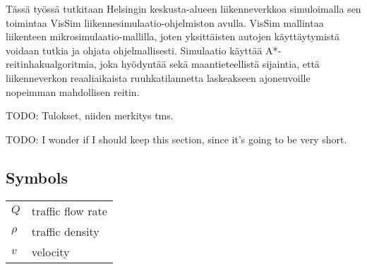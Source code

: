 \documentclass[english, 12pt, a4paper, elec, utf8, pdfa, online]{aaltothesis}
\newcommand{\pubdate}{<Publish date>}
\begin{document}
\begin{abstractpage}[finnish]
{    Tässä työssä tutkitaan Helsingin keskusta-alueen liikenneverkkoa simuloimalla sen toimintaa VisSim liikennesimulaatio-ohjelmiston avulla. VisSim mallintaa liikenteen mikrosimulaatio-mallilla, joten yksittäisten autojen käyttäytymistä voidaan tutkia ja ohjata ohjelmallisesti. Simulaatio käyttää A*-reitinhakualgoritmia, joka hyödyntää sekä maantieteellistä sijaintia, että liikenneverkon reaaliaikaista ruuhkatilannetta laskeakseen ajoneuvoille nopeimman mahdollisen reitin.

    TODO: Tulokset, niiden merkitys tms.
    }

\end{abstractpage}

\newpage






\thesistableofcontents



TODO: I wonder if I should keep this section, since it's going to be very short.

\subsection*{Symbols}

\begin{tabular}{ll}
$Q$  & traffic flow rate  \\
$\rho$              & traffic density  \\
$v$              & velocity  \\
\end{tabular}


\end{document}
